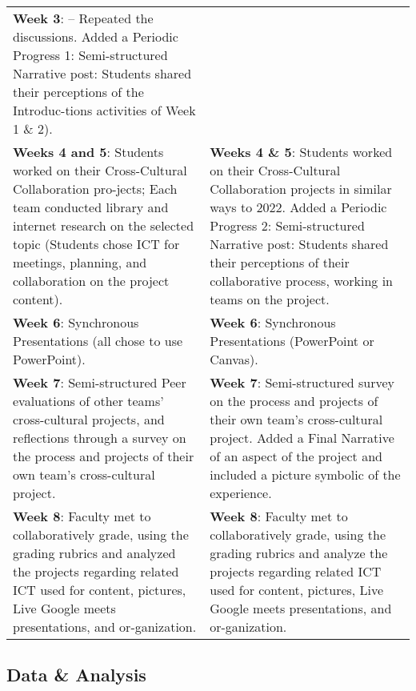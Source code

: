 \begin{table}[htpb]
\begin{threeparttable}
\begin{tabular}{*{2}{p{}}}
\textbf{Week 3}: – Repeated the discussions.
Added a Periodic Progress 1: Semi-structured Narrative post: Students shared their perceptions of the Introduc-tions activities of Week 1 \& 2). \\
										
\textbf{Weeks 4 and 5}: Students worked on their Cross-Cultural Collaboration pro-jects; Each team conducted library and internet research on the selected topic (Students chose ICT for meetings, planning, and collaboration on the project content). & 
					
\textbf{Weeks 4 \& 5}: Students worked on their Cross-Cultural Collaboration projects in similar ways to 2022.  
Added a Periodic Progress 2: Semi-structured Narrative post: Students shared their perceptions of their collaborative process, working in teams on the project. \\
					
\textbf{Week 6}: Synchronous Presentations (all chose to use PowerPoint). &
									
\textbf{Week 6}: Synchronous Presentations (PowerPoint or Canvas). \\
					
\textbf{Week 7}: Semi-structured Peer evaluations of other teams' cross-cultural projects, and reflections through a survey on the process and projects of their own team's cross-cultural project. &
					
\textbf{Week 7}: Semi-structured survey on the process and projects of their own team's cross-cultural project.
Added a Final Narrative of an aspect of the project and included a picture symbolic of the experience. \\
					
\textbf{Week 8}: Faculty met to collaboratively grade, using the grading rubrics and analyzed the projects regarding related ICT used for content, pictures, Live Google meets presentations, and or-ganization. &
					
\textbf{Week 8}: Faculty met to collaboratively grade, using the grading rubrics and analyze the projects regarding related ICT used for content, pictures, Live Google meets presentations, and or-ganization.\\
\bottomrule
\end{tabular}
\end{threeparttable}
\end{table}

		
\subsection{Data \& Analysis}\label{sub-sec-dataandanalysis}
		
